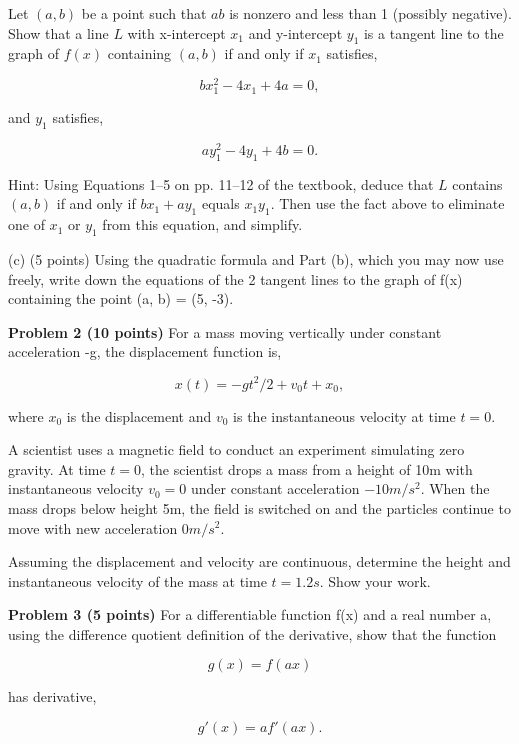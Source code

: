 \documentclass{article}
\begin{document}
Let $(a, b)$ be a point such that $ab$ is nonzero and less than 1 (possibly negative). Show that a line $L$ with x-intercept $x_1$ and y-intercept $y_1$ is a tangent line to the graph of $f(x)$ containing $(a, b)$ if and only if $x_1$ satisfies,

\[bx^2_1 - 4x_1 + 4a = 0,\]

and $y_1$ satisfies,

\[ay^2_1 - 4y_1 + 4b = 0.\]

Hint: Using Equations 1–5 on pp. 11–12 of the textbook, deduce that $L$ contains $(a, b)$ if and only if $bx_1 + ay_1$ equals $x_1y_1$. Then use the fact above to eliminate one of $x_1$ or $y_1$ from this equation, and simplify.

(c) (5 points) Using the quadratic formula and Part (b), which you may now use freely, write down the equations of the 2 tangent lines to the graph of f(x) containing the point (a, b) = (5, -3).

\noindent \textbf{Problem 2 (10 points)} For a mass moving vertically under constant acceleration -g, the displacement function is,

\[x(t) = -gt^2/2 + v_{0}t + x_{0},\]

where $x_{0}$ is the displacement and $v_{0}$ is the instantaneous velocity at time $t = 0$.

A scientist uses a magnetic field to conduct an experiment simulating zero gravity. At time $t = 0$, the scientist drops a mass from a height of 10m with instantaneous velocity $v_{0} = 0$ under constant acceleration $-10m/s^2$. When the mass drops below height 5m, the field is switched on and the particles continue to move with new acceleration $0m/s^2$.

Assuming the displacement and velocity are continuous, determine the height and instantaneous velocity of the mass at time $t = 1.2s$. Show your work.

\noindent \textbf{Problem 3 (5 points)} For a differentiable function f(x) and a real number a, using the difference quotient definition of the derivative, show that the function

\[g(x) = f(ax)\]

has derivative,

\[g'(x) = af'(ax).\]
\end{document}
